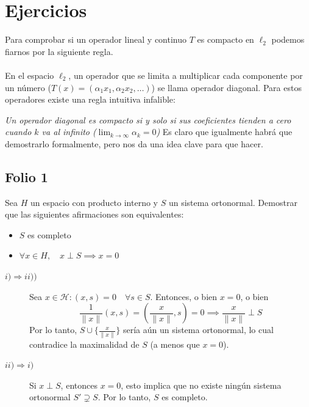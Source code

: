 \chapter{Ejercicios}
\begin{observacion}
    Para comprobar si un operador lineal y continuo $T$ es compacto en $\ell_2$ podemos fiarnos por la siguiente regla. \\ \\
    \noindent
    En el espacio $\ell_2$, un operador que se limita a multiplicar cada componente por un número ($T(x) = (\alpha_1 x_1, \alpha_2 x_2, \dots)$) se llama operador diagonal. Para estos operadores existe una regla intuitiva infalible:
    
    \textit{Un operador diagonal es compacto si y solo si sus coeficientes tienden a cero cuando $k$ va al infinito ($\lim_{k \to \infty} \alpha_k = 0$)}
    \noindent
    Es claro que igualmente habrá que demostrarlo formalmente, pero nos da una idea clave para que hacer.
\end{observacion}

\section{Folio 1}
\begin{ejercicio}
    Sea $H$ un espacio con producto interno y $S$ un sistema ortonormal. Demostrar que las siguientes afirmaciones son equivalentes:
    \begin{itemize}
        \item[(i)] $S$ es completo
        \item[(ii)] $\forall x \in H, \quad x \perp S \implies x = 0$
    \end{itemize}
    \begin{description}
    \item[$i)\Longrightarrow ii))$] Sea $x \in \mathcal{H} : (x, s) = 0 \quad \forall s \in S$. Entonces, o bien $x=0$, o bien 
    $$\frac{1}{\|x\|}(x, s) = \left(\frac{x}{\|x\|}, s\right) = 0 \implies \frac{x}{\|x\|} \perp S$$
    Por lo tanto, $S \cup \{ \frac{x}{\|x\|} \}$ sería aún un sistema ortonormal, lo cual contradice la maximalidad de $S$ (a menos que $x=0$).
    \item[$ii)\Longrightarrow i)$] Si $x \perp S$, entonces $x = 0$, esto implica que no existe ningún sistema ortonormal $S' \supsetneq S$. Por lo tanto, $S$ es completo.
\end{description}
\end{ejercicio}

